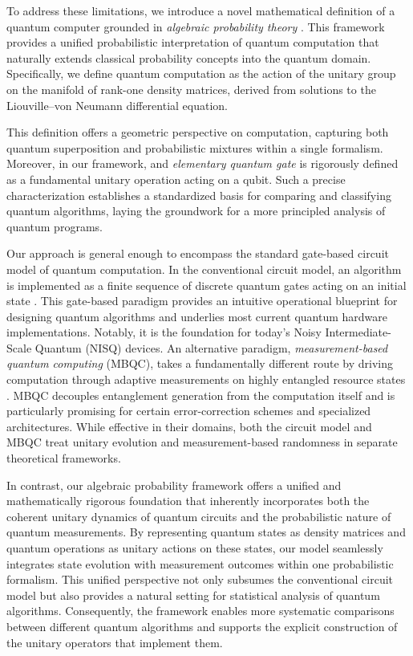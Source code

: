 \documentclass[a4paper,11pt]{article}
\begin{document}
To address these limitations, we introduce a novel mathematical definition of a quantum computer 
grounded in \emph{algebraic probability theory} \cite{Gudder88,Meyer95,Parthasarathy1992}. 
This framework provides a unified probabilistic interpretation of quantum computation 
that naturally extends classical probability concepts into the quantum domain. 
Specifically, we define quantum computation as the action of the unitary group on 
the manifold of rank-one density matrices, derived from solutions to the Liouville--von Neumann 
differential equation. 

This definition offers a geometric perspective on computation, capturing both quantum superposition 
and probabilistic mixtures within a single formalism. Moreover, in our framework, and
\emph{elementary quantum gate} is rigorously defined as a fundamental unitary operation acting on a qubit. 
Such a precise characterization establishes a standardized basis for comparing and classifying 
quantum algorithms, laying the groundwork for a more principled analysis of quantum programs.


Our approach is general enough to encompass the standard gate-based circuit model of quantum computation. In the conventional circuit model, an algorithm is implemented as a finite sequence of discrete quantum gates acting on an initial state \cite{Nielsen_Chuang_2010,Kitaev2002}. This gate-based paradigm provides an intuitive operational blueprint for designing quantum algorithms and underlies most current quantum hardware implementations. Notably, it is the foundation for today’s Noisy Intermediate-Scale Quantum (NISQ) devices. An alternative paradigm, \textit{measurement-based quantum computing} (MBQC), takes a fundamentally different route by driving computation through adaptive measurements on highly entangled resource states \cite{Raussendorf2001}. MBQC decouples entanglement generation from the computation itself and is particularly promising for certain error-correction schemes and specialized architectures. While effective in their domains, both the circuit model and MBQC treat unitary evolution and measurement-based randomness in separate theoretical frameworks.

In contrast, our algebraic probability framework offers a unified and mathematically rigorous foundation that inherently incorporates both the coherent unitary dynamics of quantum circuits and the probabilistic nature of quantum measurements. By representing quantum states as density matrices and quantum operations as unitary actions on these states, our model seamlessly integrates state evolution with measurement outcomes within one probabilistic formalism. This unified perspective not only subsumes the conventional circuit model but also provides a natural setting for statistical analysis of quantum algorithms. Consequently, the framework enables more systematic comparisons between different quantum algorithms and supports the explicit construction of the unitary operators that implement them.
\end{document}
